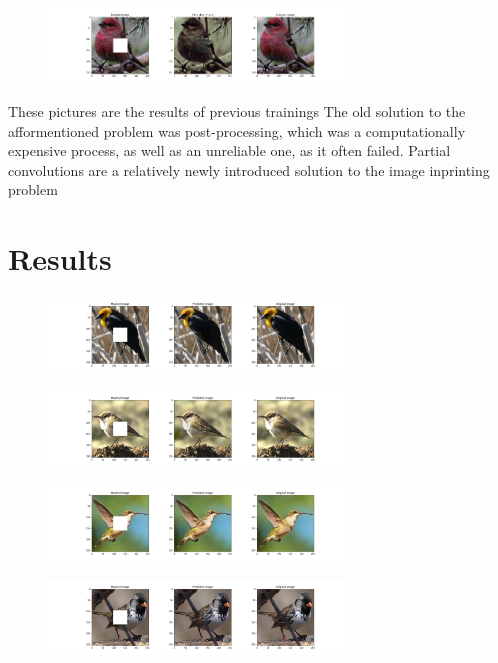 \documentclass[conference]{IEEEtran}
\begin{document}
\begin{figure}[!htb]
  \centering
  \includegraphics[width=80mm, keepaspectratio]{figures/err_3.png}
\end{figure}

These pictures are the results of previous trainings 
The old solution to the afformentioned problem was post-processing, which was a computationally expensive process, as well as an unreliable one, as it often failed.
Partial convolutions are a relatively newly introduced solution to the image inprinting problem 

\section{Results}

\begin{figure}[!htb]
  \centering
  \includegraphics[width=80mm, keepaspectratio]{figures/result_1.png}
\end{figure}

\begin{figure}[!htb]
  \centering
  \includegraphics[width=80mm, keepaspectratio]{figures/result_2.png}
\end{figure}

\begin{figure}[!htb]
  \centering
  \includegraphics[width=80mm, keepaspectratio]{figures/result_3.png}
\end{figure}

\begin{figure}[!htb]
  \centering
  \includegraphics[width=80mm, keepaspectratio]{figures/result_4.png}
\end{figure}
\end{document}
